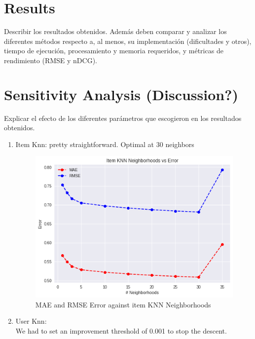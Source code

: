 \documentclass[letterpaper, 10 pt, conference]{ieeeconf}  %
\begin{document}
\section{Results}

Describir los resultados obtenidos. Además deben comparar y
analizar los diferentes métodos respecto a, al menos, su implementación (dificultades y otros),
tiempo de ejecución, procesamiento y memoria requeridos, y métricas de rendimiento (RMSE y
nDCG).

\section{Sensitivity Analysis (Discussion?)}

Explicar el efecto de los diferentes parámetros
que escogieron en los resultados obtenidos.
\begin{enumerate}
    \item Item Knn: pretty straightforward. Optimal at 30 neighbors
    
    \begin{figure}[h]
        \includegraphics[scale=0.4]{item_knn-param-analysis.png}
        \centering
        \caption{MAE and RMSE Error against item KNN Neighborhoods}
        \label{fig:item_knn-param-analysis}
    \end{figure}
        
    \item User Knn: \\
    
    We had to set an improvement threshold of 0.001 to stop the descent.\\
    

\end{enumerate}
\end{document}
